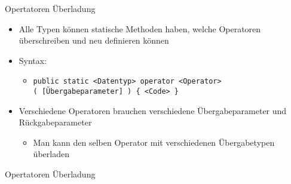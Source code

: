 \begin{frame}{Opertatoren Überladung}
	\begin{itemize}
		\item Alle Typen können statische Methoden haben, welche Operatoren überschreiben und neu definieren können
		\item Syntax:
		\begin{itemize}
			\item \texttt{public static \alert{<Datentyp>} operator \alert{<Operator>}\\( \alert{[Übergabeparameter]} ) \{ \alert{<Code>} \}}
		\end{itemize}
		\item Verschiedene Operatoren brauchen verschiedene Übergabeparameter und Rückgabeparameter
		\begin{itemize}
			 \item Man kann den selben Operator mit verschiedenen Übergabetypen überladen
		\end{itemize}
	\end{itemize}
\end{frame}

\begin{frame}{Opertatoren Überladung}
	
	
\end{frame}

